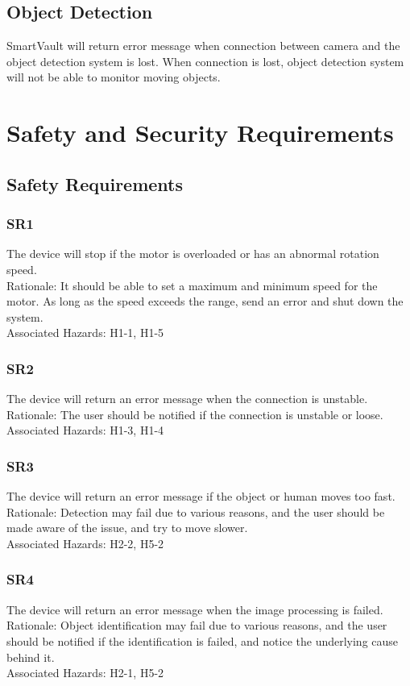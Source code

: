 \documentclass{article}
\begin{document}
\subsection{Object Detection}
SmartVault will return error message when connection between camera and the object detection system is lost. When connection is lost, object detection system will not be able to monitor moving objects.
\section{Safety and Security Requirements}
\subsection{Safety Requirements}
\subsubsection{SR1}
The device will stop if the motor is overloaded or has an abnormal rotation speed.\\
Rationale: It should be able to set a maximum and minimum speed for the motor. As long as the speed exceeds the range, send an error and shut down the system.\\
Associated Hazards: H1-1, H1-5
\subsubsection{SR2}
The device will return an error message when the connection is unstable.\\
Rationale: The user should be notified if the connection is unstable or loose.\\
Associated Hazards: H1-3, H1-4
\subsubsection{SR3}
The device will return an error message if the object or human moves too fast.\\
Rationale: Detection may fail due to various reasons, and the user should be made aware of the issue, and try to move slower.\\
Associated Hazards: H2-2, H5-2
\subsubsection{SR4}
The device will return an error message when the image processing is failed.\\
Rationale: Object identification may fail due to various reasons, and the user should be notified if the identification is failed, and notice the underlying cause behind it.\\
Associated Hazards: H2-1, H5-2
\end{document}
